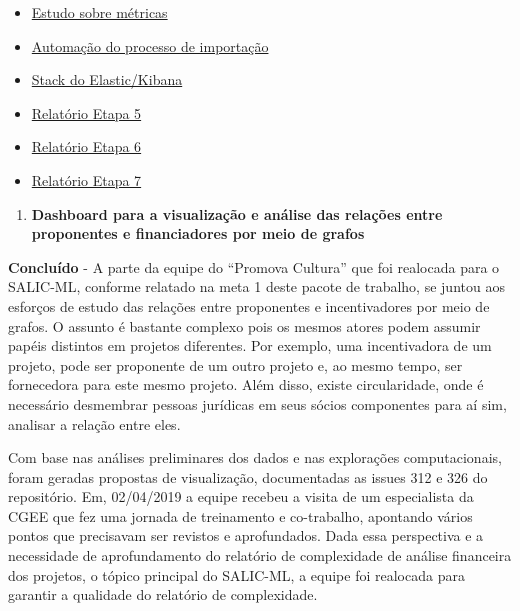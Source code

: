 \begin{itemize}
\item
  \href{https://github.com/lappis-unb/tais/wiki/Estudo-sobre-metricas-para-bots}{Estudo
  sobre métricas}
\item
  \href{https://github.com/lappis-unb/rasa-ptbr-boilerplate/blob/master/analytics/import_dashboards.py}{Automação
  do processo de importação}
\item
  \href{https://github.com/lappis-unb/tais/blob/master/README.md}{Stack
  do Elastic/Kibana}
\item
  \href{https://github.com/lappis-unb/EcossistemasSWLivre/blob/master/Relatorios/R5/RELATÓRIO\%20ETAPA\%205.pdf}{Relatório
  Etapa 5}
\item
  \href{https://github.com/lappis-unb/EcossistemasSWLivre/blob/master/Relatorios/R6/RELATÓRIO\%20ETAPA\%206.pdf}{Relatório
  Etapa 6}
\item
  \href{https://github.com/lappis-unb/EcossistemasSWLivre/blob/master/Relatorios/R7/RELATÓRIO\%20ETAPA\%207.pdf}{Relatório
  Etapa 7}
\end{itemize}

\begin{enumerate}
\def\labelenumi{\arabic{enumi}.}
\setcounter{enumi}{2}
\tightlist
\item
  \textbf{Dashboard para a visualização e análise das relações entre
  proponentes e financiadores por meio de grafos}
\end{enumerate}

\textbf{Concluído} - A parte da equipe do ``Promova Cultura'' que foi
realocada para o SALIC-ML, conforme relatado na meta 1 deste pacote de
trabalho, se juntou aos esforços de estudo das relações entre
proponentes e incentivadores por meio de grafos. O assunto é bastante
complexo pois os mesmos atores podem assumir papéis distintos em
projetos diferentes. Por exemplo, uma incentivadora de um projeto, pode
ser proponente de um outro projeto e, ao mesmo tempo, ser fornecedora
para este mesmo projeto. Além disso, existe circularidade, onde é
necessário desmembrar pessoas jurídicas em seus sócios componentes para
aí sim, analisar a relação entre eles.

Com base nas análises preliminares dos dados e nas explorações
computacionais, foram geradas propostas de visualização, documentadas as
issues 312 e 326 do repositório. Em, 02/04/2019 a equipe recebeu a
visita de um especialista da CGEE que fez uma jornada de treinamento e
co-trabalho, apontando vários pontos que precisavam ser revistos e
aprofundados. Dada essa perspectiva e a necessidade de aprofundamento do
relatório de complexidade de análise financeira dos projetos, o tópico
principal do SALIC-ML, a equipe foi realocada para garantir a qualidade
do relatório de complexidade.

